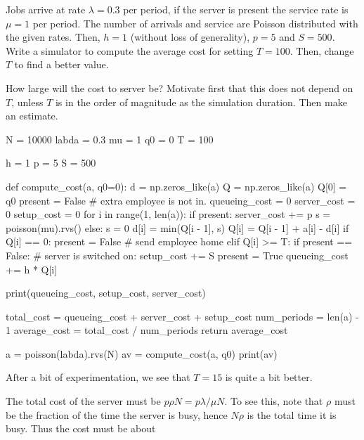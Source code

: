 \documentclass{scrartcl}
\begin{document}
\begin{exercise}
  Jobs arrive at rate $\lambda=0.3$ per period, if the server is present the service rate is $\mu=1$ per period. The number of arrivals and service are Poisson distributed with the given rates. Then, $h=1$ (without loss of generality), $p=5$ and $S=500$. Write a simulator to compute the average cost for setting $T=100$. Then, change $T$ to find a better value.

How large will the cost to server be? Motivate first that this does not depend on $T$, unless $T$ is in the order of magnitude as the simulation duration. Then make an estimate.
  
\begin{solution}
  
\begin{pyverbatim}
N = 10000
labda = 0.3
mu = 1
q0 = 0
T = 100

h = 1
p = 5
S = 500


def compute_cost(a, q0=0):
    d = np.zeros_like(a)
    Q = np.zeros_like(a)
    Q[0] = q0
    present = False  # extra employee is not in.
    queueing_cost = 0
    server_cost = 0
    setup_cost = 0
    for i in range(1, len(a)):
        if present:
            server_cost += p
            s = poisson(mu).rvs()
        else:
            s = 0
        d[i] = min(Q[i - 1], s)
        Q[i] = Q[i - 1] + a[i] - d[i]
        if Q[i] == 0:
            present = False  # send employee home
        elif Q[i] >= T:
            if present == False:  # server is switched on:
                setup_cost += S
            present = True
        queueing_cost += h * Q[i]

    print(queueing_cost, setup_cost, server_cost)

    total_cost = queueing_cost + server_cost + setup_cost
    num_periods = len(a) - 1
    average_cost = total_cost / num_periods
    return average_cost

a = poisson(labda).rvs(N)
av = compute_cost(a, q0)
print(av)
\end{pyverbatim}
After a bit of experimentation, we see that $T=15$ is quite a bit better.

The total cost of the server must be $ p \rho N = p \lambda/\mu N$. To see this, note that $\rho$ must be the fraction of the time the server is busy, hence $N\rho$ is the total time it is busy. Thus the cost must be about  
\end{solution}


\end{exercise}
\end{document}
